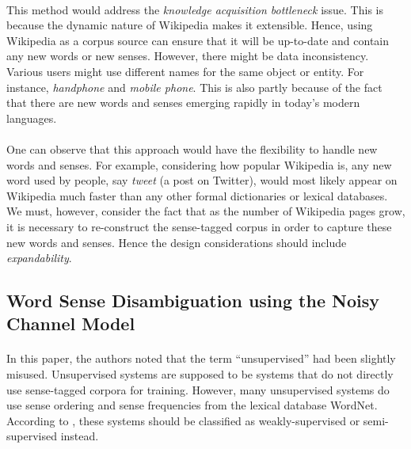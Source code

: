 \documentclass[12 pt]{article}
\begin{document}
\paragraph{}
This method would address the \textit{knowledge acquisition bottleneck} issue. This is because the dynamic nature of Wikipedia makes it extensible. Hence, using Wikipedia as a corpus source can ensure that it will be up-to-date and contain any new words or new senses. However, there might be data inconsistency. Various users might use different names for the same object or entity. For instance, \textit{handphone} and \textit{mobile phone}. This is also partly because of the fact that there are new words and senses emerging rapidly in today's modern languages.

\paragraph{}
One can observe that this approach would have the flexibility to handle new words and senses. For example, considering how popular Wikipedia is, any new word used by people, say \textit{tweet} (a post on Twitter), would most likely appear on Wikipedia much faster than any other formal dictionaries or lexical databases. We must, however, consider the fact that as the number of Wikipedia pages grow, it is necessary to re-construct the sense-tagged corpus in order to capture these new words and senses. Hence the design considerations should include \textit{expandability}.

\subsection{Word Sense Disambiguation using the Noisy Channel Model}
\label{noisychannel}
\paragraph{}
In this paper, the authors noted that the term ``unsupervised'' had been slightly misused. Unsupervised systems are supposed to be systems that do not directly use sense-tagged corpora for training. However, many unsupervised systems do use sense ordering and sense frequencies from the lexical database WordNet. According to \cite{noisychannel}, these systems should be classified as weakly-supervised or semi-supervised instead.
\end{document}
